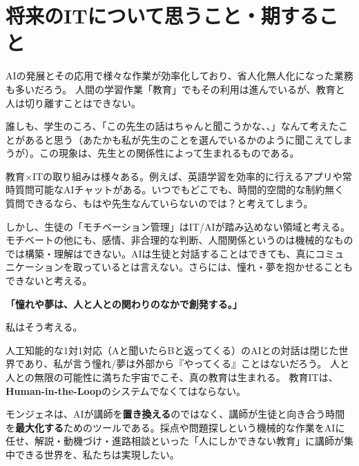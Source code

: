\documentclass[paper=a4,fontsize=10.5bp,jafontsize=10.5bp,twocolumn]{jlreq}
\begin{document}
\section{将来のITについて思うこと・期すること}

AIの発展とその応用で様々な作業が効率化しており、省人化無人化になった業務も多いだろう。
人間の学習作業「教育」でもその利用は進んでいるが、教育と人は切り離すことはできない。

誰しも、学生のころ、「この先生の話はちゃんと聞こうかな、、」なんて考えたことがあると思う（あたかも私が先生のことを選んでいるかのように聞こえてしまうが）。この現象は、先生との関係性によって生まれるものである。

教育×ITの取り組みは様々ある。例えば、英語学習を効率的に行えるアプリや常時質問可能なAIチャットがある。いつでもどこでも、時間的空間的な制約無く質問できるなら、もはや先生なんていらないのでは？と考えてしまう。

しかし、生徒の「モチベーション管理」はIT/AIが踏み込めない領域と考える。モチベートの他にも、感情、非合理的な判断、人間関係というのは機械的なものでは構築・理解はできない。AIは生徒と対話することはできても、真にコミュニケーションを取っているとは言えない。さらには、憧れ・夢を抱かせることもできないと考える。

\begin{highlightbox}
\textbf{「憧れや夢は、人と人との関わりのなかで創発する。」}

私はそう考える。

人工知能的な1対1対応（Aと聞いたらBと返ってくる）のAIとの対話は閉じた世界であり、私が言う憧れ/夢は外部から『やってくる』ことはないだろう。
人と人との無限の可能性に満ちた宇宙でこそ、真の教育は生まれる。
教育ITは、\textbf{Human-in-the-Loop}のシステムでなくてはならない。
\end{highlightbox}

モンジェネは、AIが講師を\textbf{置き換える}のではなく、講師が生徒と向き合う時間を\textbf{最大化する}ためのツールである。採点や問題探しという機械的な作業をAIに任せ、解説・動機づけ・進路相談といった「人にしかできない教育」に講師が集中できる世界を、私たちは実現したい。
\end{document}
